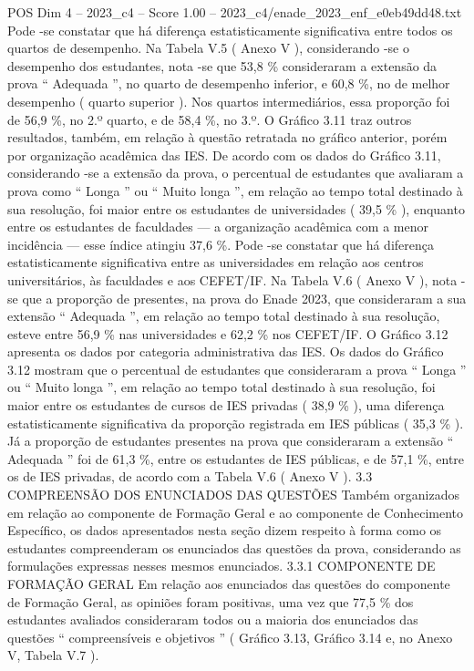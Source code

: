 \begin{textsample}{POS Dim 4 – 2023\_c4 – Score 1.00 – 2023\_c4/enade\_2023\_enf\_e0eb49dd48.txt}
Pode -se constatar que há diferença estatisticamente significativa entre todos os quartos de desempenho.
Na Tabela V.5 ( Anexo V ), considerando -se o desempenho dos estudantes, nota -se que 53,8 \% consideraram a extensão da prova “ Adequada ”, no quarto de desempenho inferior, e 60,8 \%, no de melhor desempenho ( quarto superior ).
Nos quartos intermediários, essa proporção foi de 56,9 \%, no 2.º quarto, e de 58,4 \%, no 3.º.
O Gráfico 3.11 traz outros resultados, também, em relação à questão retratada no gráfico anterior, porém por organização acadêmica das IES.
De acordo com os dados do Gráfico 3.11, considerando -se a extensão da prova, o percentual de estudantes que avaliaram a prova como “ Longa ” ou “ Muito longa ”, em relação ao tempo total destinado à sua resolução, foi maior entre os estudantes de universidades ( 39,5 \% ), enquanto entre os estudantes de faculdades — a organização acadêmica com a menor incidência — esse índice atingiu 37,6 \%.
Pode -se constatar que há diferença estatisticamente significativa entre as universidades em relação aos centros universitários, às faculdades e aos CEFET/IF.
Na Tabela V.6 ( Anexo V ), nota -se que a proporção de presentes, na prova do Enade 2023, que consideraram a sua extensão “ Adequada ”, em relação ao tempo total destinado à sua resolução, esteve entre 56,9 \% nas universidades e 62,2 \% nos CEFET/IF.
O Gráfico 3.12 apresenta os dados por categoria administrativa das IES.
Os dados do Gráfico 3.12 mostram que o percentual de estudantes que consideraram a prova “ Longa ” ou “ Muito longa ”, em relação ao tempo total destinado à sua resolução, foi maior entre os estudantes de cursos de IES privadas ( 38,9 \% ), uma diferença estatisticamente significativa da proporção registrada em IES públicas ( 35,3 \% ).
Já a proporção de estudantes presentes na prova que consideraram a extensão “ Adequada ” foi de 61,3 \%, entre os estudantes de IES públicas, e de 57,1 \%, entre os de IES privadas, de acordo com a Tabela V.6 ( Anexo V ). 3.3 COMPREENSÃO DOS ENUNCIADOS DAS QUESTÕES Também organizados em relação ao componente de Formação Geral e ao componente de Conhecimento Específico, os dados apresentados nesta seção dizem respeito à forma como os estudantes compreenderam os enunciados das questões da prova, considerando as formulações expressas nesses mesmos enunciados. 3.3.1 COMPONENTE DE FORMAÇÃO GERAL Em relação aos enunciados das questões do componente de Formação Geral, as opiniões foram positivas, uma vez que 77,5 \% dos estudantes avaliados consideraram todos ou a maioria dos enunciados das questões “ compreensíveis e objetivos ” ( Gráfico 3.13, Gráfico 3.14 e, no Anexo V, Tabela V.7 ).

\end{textsample}
